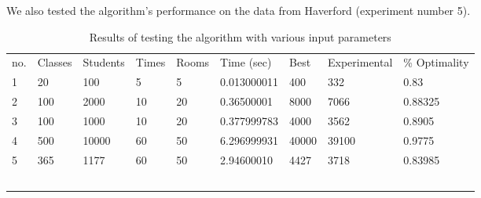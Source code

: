 \documentclass[11pt, oneside]{article}   	%
\begin{document}
We also tested the algorithm's performance on the data from Haverford (experiment number 5).


\begin{table}[h]
\centering
\begin{tabular}{lllllllll}
no. & Classes & Students & Times & Rooms & Time (sec) & Best  & Experimental & \% Optimality \\
1             & 20         & 100         & 5        & 5        & 0.013000011    & 400   & 332          & 0.83          \\
2             & 100        & 2000        & 10       & 20       & 0.36500001     & 8000  & 7066         & 0.88325       \\
3             & 100        & 1000        & 10       & 20       & 0.377999783    & 4000  & 3562         & 0.8905        \\
4             & 500        & 10000       & 60       & 50       & 6.296999931    & 40000 & 39100        & 0.9775        \\
5            & 365            & 1177            & 60       & 50      & 2.94600010         & 4427      & 3718             & 0.83985    \\
              &            &             &          &          &                &       &              &               \\
              &            &             &          &          &                &       &              &               \\
              &            &             &          &          &                &       &              &               \\
              &            &             &          &          &                &       &              &               \\
              &            &             &          &          &                &       &              &               \\
\end{tabular}
\caption{Results of testing the algorithm with various input parameters}
\label{my-label}
\end{table}
\end{document}
